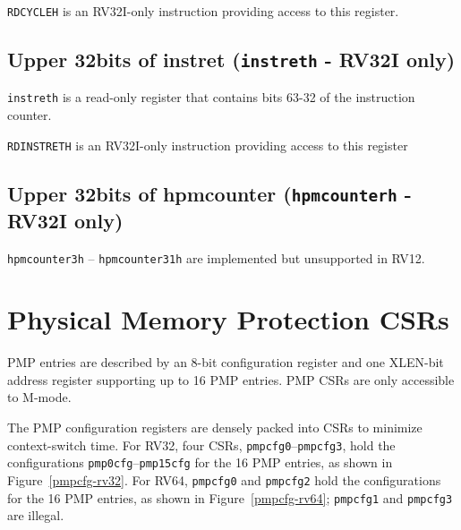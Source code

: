 \texttt{RDCYCLEH} is an RV32I-only instruction providing access to this register.

\subsection{Upper 32bits of instret (\texttt{instreth} - RV32I
only)}\label{upper-32bit-of-instret-instreth---rv32i-only}

\texttt{instreth} is a read-only register that contains bits 63-32 of the
instruction counter.

\texttt{RDINSTRETH} is an RV32I-only instruction providing access to this
register

\subsection{Upper 32bits of hpmcounter (\texttt{hpmcounterh} - RV32I
only)} \label{high-performance-monitoring-counters-rv32}

\texttt{hpmcounter3h} -- \texttt{hpmcounter31h} are implemented but unsupported in RV12.




\section{Physical Memory Protection CSRs}

PMP entries are described by an 8-bit configuration register and one XLEN-bit
address register supporting up to 16 PMP entries. PMP CSRs are only accessible to M-mode.

The PMP configuration registers are densely packed into CSRs to minimize
context-switch time.  For RV32, four CSRs, \texttt{pmpcfg0}--\texttt{pmpcfg3}, hold
the configurations \texttt{pmp0cfg}--\texttt{pmp15cfg} for the 16 PMP entries, as
shown in Figure~\ref{pmpcfg-rv32}.  For RV64, \texttt{pmpcfg0} and \texttt{pmpcfg2}
hold the configurations for the 16 PMP entries, as shown in
Figure~\ref{pmpcfg-rv64}; \texttt{pmpcfg1} and \texttt{pmpcfg3} are illegal.

